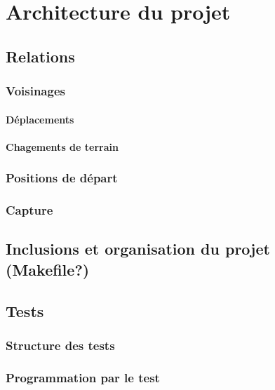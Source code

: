 \chapter{Architecture du projet}
\section{Relations}
\subsection{Voisinages}
\subsubsection{Déplacements}
\subsubsection{Chagements de terrain}
\subsection{Positions de départ}
\subsection{Capture}

\section{Inclusions et organisation du projet (Makefile?)}

\section{Tests}
\subsection{Structure des tests}
\subsection{Programmation par le test}